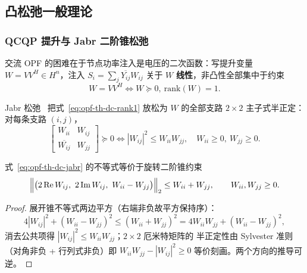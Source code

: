 \subsection{凸松弛一般理论}\label{sec:opf-th-dc-relax}

\subsubsection{QCQP 提升与 Jabr 二阶锥松弛}

交流 OPF 的困难在于节点功率注入是电压的二次函数：写提升变量
$W=VV^{H}\in H^n$，注入 $S_i=\sum_j\overline{Y_{ij}}W_{ij}$ 关于 $W$
\textbf{线性}，非凸性全部集中于约束
\begin{equation}
W=VV^{H}\iff W\succeq0,\ \mathrm{rank}(W)=1 .
\label{eq:opf-th-dc-rank1}
\end{equation}

\begin{definition}\label{def:opf-th-dc-jabr}
Jabr 松弛~\cite{opfdc:jabr} 把式~\eqref{eq:opf-th-dc-rank1} 放松为
$W$ 的全部支路 $2\times2$ 主子式半正定：对每条支路 $(i,j)$，
\begin{equation}
\begin{bmatrix}W_{ii}&W_{ij}\\ \overline{W_{ij}}&W_{jj}\end{bmatrix}\succeq0
\iff
|W_{ij}|^2\le W_{ii}W_{jj},\quad W_{ii}\ge0,\ W_{jj}\ge0 .
\label{eq:opf-th-dc-jabr}
\end{equation}
\end{definition}

\begin{proposition}[旋转二阶锥刻画]\label{prop:opf-th-dc-rotsoc}
式~\eqref{eq:opf-th-dc-jabr} 的不等式等价于旋转二阶锥约束
\begin{equation}
\Bigl\lVert\bigl(2\,\mathrm{Re}\,W_{ij},\ 2\,\mathrm{Im}\,W_{ij},\
W_{ii}-W_{jj}\bigr)\Bigr\rVert_2\le W_{ii}+W_{jj},
\qquad W_{ii},W_{jj}\ge0 .
\label{eq:opf-th-dc-rotsoc}
\end{equation}
\end{proposition}

\begin{proof}
展开锥不等式两边平方（右端非负故平方保持序）：
\begin{equation}
4|W_{ij}|^2+(W_{ii}-W_{jj})^2\le(W_{ii}+W_{jj})^2
=4W_{ii}W_{jj}+(W_{ii}-W_{jj})^2,
\end{equation}
消去公共项得 $|W_{ij}|^2\le W_{ii}W_{jj}$；$2\times2$ 厄米特矩阵的
半正定性由 Sylvester 准则（对角非负 + 行列式非负）即
$W_{ii}W_{jj}-|W_{ij}|^2\ge0$ 等价刻画。两个方向的推导可逆。
\end{proof}

